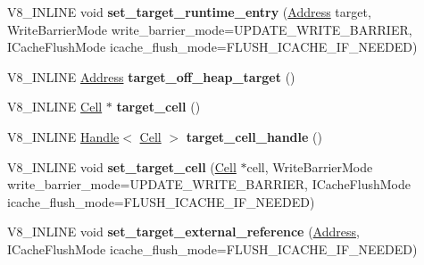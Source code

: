 \begin{DoxyCompactItemize}
\item 
\mbox{\label{classv8_1_1internal_1_1RelocInfo_a5abb732e980c69d05896adbd636c2c1c}} 
V8\+\_\+\+I\+N\+L\+I\+NE void {\bfseries set\+\_\+target\+\_\+runtime\+\_\+entry} (\mbox{\hyperlink{classuintptr__t}{Address}} target, Write\+Barrier\+Mode write\+\_\+barrier\+\_\+mode=U\+P\+D\+A\+T\+E\+\_\+\+W\+R\+I\+T\+E\+\_\+\+B\+A\+R\+R\+I\+ER, I\+Cache\+Flush\+Mode icache\+\_\+flush\+\_\+mode=F\+L\+U\+S\+H\+\_\+\+I\+C\+A\+C\+H\+E\+\_\+\+I\+F\+\_\+\+N\+E\+E\+D\+ED)
\item 
\mbox{\label{classv8_1_1internal_1_1RelocInfo_a989dacaf1a8166d06b75076a429651c2}} 
V8\+\_\+\+I\+N\+L\+I\+NE \mbox{\hyperlink{classuintptr__t}{Address}} {\bfseries target\+\_\+off\+\_\+heap\+\_\+target} ()
\item 
\mbox{\label{classv8_1_1internal_1_1RelocInfo_a8ef575c2919bd0c7635907be06135a9a}} 
V8\+\_\+\+I\+N\+L\+I\+NE \mbox{\hyperlink{classv8_1_1internal_1_1Cell}{Cell}} $\ast$ {\bfseries target\+\_\+cell} ()
\item 
\mbox{\label{classv8_1_1internal_1_1RelocInfo_aa60abc3d0a501dd3fe966cfc2b3ecf71}} 
V8\+\_\+\+I\+N\+L\+I\+NE \mbox{\hyperlink{classv8_1_1internal_1_1Handle}{Handle}}$<$ \mbox{\hyperlink{classv8_1_1internal_1_1Cell}{Cell}} $>$ {\bfseries target\+\_\+cell\+\_\+handle} ()
\item 
\mbox{\label{classv8_1_1internal_1_1RelocInfo_a4040bacc5338bb8fcc472d4ace72c2ca}} 
V8\+\_\+\+I\+N\+L\+I\+NE void {\bfseries set\+\_\+target\+\_\+cell} (\mbox{\hyperlink{classv8_1_1internal_1_1Cell}{Cell}} $\ast$cell, Write\+Barrier\+Mode write\+\_\+barrier\+\_\+mode=U\+P\+D\+A\+T\+E\+\_\+\+W\+R\+I\+T\+E\+\_\+\+B\+A\+R\+R\+I\+ER, I\+Cache\+Flush\+Mode icache\+\_\+flush\+\_\+mode=F\+L\+U\+S\+H\+\_\+\+I\+C\+A\+C\+H\+E\+\_\+\+I\+F\+\_\+\+N\+E\+E\+D\+ED)
\item 
\mbox{\label{classv8_1_1internal_1_1RelocInfo_aecae1b893a70cbbd672ae9e3e14270e1}} 
V8\+\_\+\+I\+N\+L\+I\+NE void {\bfseries set\+\_\+target\+\_\+external\+\_\+reference} (\mbox{\hyperlink{classuintptr__t}{Address}}, I\+Cache\+Flush\+Mode icache\+\_\+flush\+\_\+mode=F\+L\+U\+S\+H\+\_\+\+I\+C\+A\+C\+H\+E\+\_\+\+I\+F\+\_\+\+N\+E\+E\+D\+ED)

\end{DoxyCompactItemize}
